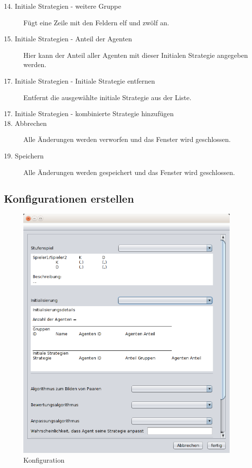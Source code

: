 \begin{description}
\item[14. Initiale Strategien - weitere Gruppe] Fügt eine Zeile mit den Feldern elf und zwölf an.

\item[15. Initiale Strategien - Anteil der Agenten] Hier kann der Anteil aller Agenten mit dieser Initialen Strategie angegeben werden.

\item[17. Initiale Strategien - Initiale Strategie entfernen] Entfernt die ausgewählte initiale Strategie aus der Liste. 

\item[17. Initiale Strategien - kombinierte Strategie hinzufügen] 

\item[18. Abbrechen] Alle Änderungen werden verworfen und das Fenster wird geschlossen.

\item[19. Speichern] Alle Änderungen werden gespeichert und das Fenster wird geschlossen.

\end{description}




\subsection{Konfigurationen erstellen}

\begin{figure}[!hp] 
  \centering
     \includegraphics[width=1.0\textwidth]{GUI_Entwurf/NeueKonfiguration1.png}
  \caption{Konfiguration}
  \label{fig:Bild2}
\end{figure}



